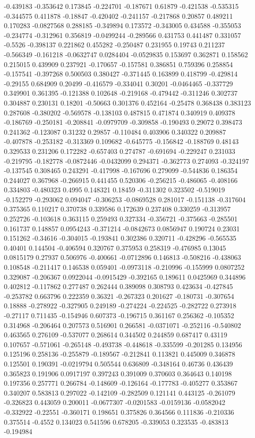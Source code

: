 -0.439183 -0.353642 0.173845 -0.224701 -0.187671 0.61879 -0.421538 -0.535315 -0.344575 0.411878 -0.18847 -0.420402 -0.241157 -0.217868 0.20857 0.489211 0.170283 -0.0827568 0.288185 -0.349894 0.173572 -0.343005 0.434588 -0.355053 -0.234774 -0.312961 0.356819 -0.0499244 -0.289566 0.431753 0.441487 0.331057 -0.5526 -0.398137 0.221862 0.455282 -0.250487 0.231955 0.19743 0.211237 -0.566349 -0.161218 -0.0632747 0.0284404 -0.0529835 0.153697 0.362871 0.158562 0.215015 0.439909 0.237921 -0.170657 -0.157581 0.386851 0.759396 0.258854 -0.157541 -0.397268 0.500503 0.380427 -0.371445 0.163899 0.418799 -0.429814 -0.29155 0.684909 0.20499 -0.416579 -0.334041 0.30201 -0.0464465 -0.337729 0.349901 0.361395 -0.121388 0.102648 -0.219168 -0.479442 -0.311246 0.302737 0.304887 0.230131 0.18201 -0.50663 0.301376 0.452164 -0.25478 0.368438 0.383123 0.287608 -0.380202 -0.569578 -0.138103 0.487815 0.471874 0.340919 0.409378 -0.186769 -0.250181 -0.208841 -0.0979709 -0.309858 -0.190493 0.29072 0.398473 0.241362 -0.123087 0.31232 0.29857 -0.110484 0.403906 0.340322 0.209887 -0.407878 -0.253182 -0.313369 0.109682 -0.645775 -0.156842 -0.188769 0.48143 0.329533 0.231206 0.172282 -0.657403 0.274787 -0.691694 -0.229247 0.231033 -0.219795 -0.182778 -0.0872446 -0.0432099 0.294371 -0.362773 0.274093 -0.324197 -0.137545 0.308465 0.243291 -0.417998 -0.167696 0.279099 -0.544836 0.186354 0.244027 0.367968 -0.266915 0.441455 0.520306 -0.256215 -0.486065 -0.408166 0.334803 -0.480323 0.4995 0.148321 0.18459 -0.311302 0.323502 -0.519019 -0.152279 -0.293062 0.094047 -0.306253 -0.0869528 0.281017 -0.151138 -0.317604 0.375365 0.110217 0.370738 0.339586 0.172639 0.237408 0.330259 -0.313957 0.252726 -0.103618 0.363115 0.259493 0.327334 -0.356721 -0.375663 -0.285501 0.161737 0.148857 0.0954243 -0.371214 -0.0842673 0.0856947 0.190724 0.23031 0.151262 -0.34616 -0.304015 -0.193841 0.302386 0.320711 -0.428296 -0.565535 0.40401 0.144504 -0.406594 0.320767 0.375953 0.258319 -0.476985 0.13045 0.0815179 0.27937 0.506976 -0.400661 -0.0712896 0.146813 -0.508216 -0.438063 0.108548 -0.211417 0.146538 0.059401 -0.0973118 -0.210996 -0.155999 0.0807252 0.329087 -0.206367 0.0922044 -0.0915429 -0.392165 0.189611 0.0425969 0.344896 0.402812 -0.117862 0.277487 0.262444 0.389098 0.308793 0.423634 -0.427845 -0.253782 0.663796 0.222359 0.36321 -0.267323 0.201627 -0.180731 -0.307654 0.18888 -0.278922 -0.327905 0.249189 -0.274224 -0.224525 -0.282722 0.273918 -0.27117 0.711435 -0.154946 0.607373 -0.196715 0.361167 0.256362 -0.105352 0.314968 -0.206464 0.207573 0.516901 0.266581 -0.0371071 -0.252116 -0.540802 0.463565 0.276109 -0.537077 0.268614 0.344502 0.244859 0.687417 0.43119 0.107657 -0.571061 -0.265148 -0.493738 -0.448618 -0.335599 -0.201285 0.134956 0.125196 0.258136 -0.255879 -0.189567 -0.212841 0.113821 0.445009 0.346878 0.125501 0.190391 -0.0219794 0.505544 0.636809 -0.348164 0.46736 0.436439 0.365823 0.191906 0.0917197 0.397243 0.391009 0.370603 0.364643 0.140198 0.197356 0.257771 0.266784 -0.148609 -0.126164 -0.177783 -0.405277 0.353867 0.340207 0.583813 0.297022 -0.142109 -0.282509 0.121141 0.443125 -0.261079 -0.326823 0.443059 0.200011 -0.0677307 -0.0201583 -0.0159136 -0.0582042 -0.332922 -0.22551 -0.360171 0.198651 0.375826 0.364566 0.111836 -0.210336 0.375514 -0.4552 0.134023 0.541596 0.678205 -0.339053 0.323535 -0.483813 -0.194984 